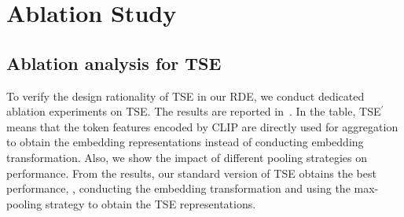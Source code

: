 \documentclass[10pt,twocolumn,letterpaper]{article}
\begin{document}
\section{Ablation Study\label{app6}}
\subsection{Ablation analysis for TSE}

To verify the design rationality of TSE in our RDE, we conduct dedicated ablation experiments on TSE. The results are reported in~. In the table, TSE$^\prime$ means that the token features encoded by CLIP are directly used for aggregation to obtain the embedding representations instead of conducting embedding transformation. Also, we show the impact of different pooling strategies on performance. From the results,  our standard version of TSE obtains the best performance, \ie, conducting the embedding transformation and using the max-pooling strategy to obtain the TSE representations.
\end{document}
